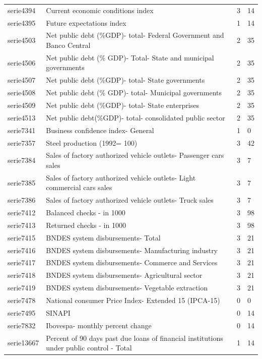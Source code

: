 \documentclass{article}
\begin{document}
{\begin{landscape}
\begin{center}
\begin{longtable}{|l|l|l|l|}
serie4394 & Current economic conditions index & 3 & 14 \\
serie4395 & Future expectations index & 1 & 14 \\
serie4503 & Net public debt (\%GDP)- total- Federal Government and Banco Central & 2 & 35 \\
serie4506 & Net public debt (\% GDP)- Total- State and municipal governments & 2 & 35 \\
serie4507 & Net public debt (\%GDP)- total- State governments & 2 & 35 \\
serie4508 & Net public debt (\% GDP)- total- Municipal governments & 2 & 35 \\
serie4509 & Net public debt (\%GDP)- total- State enterprises & 2 & 35 \\
serie4513 & Net public debt(\%GDP)- total- consolidated public sector & 2 & 35 \\
serie7341 & Business confidence index- General & 1 & 0 \\
serie7357 & Steel production (1992= 100) & 3 & 42 \\
serie7384 & Sales of factory authorized vehicle outlets- Passenger cars sales & 3 & 7 \\
serie7385 & Sales of factory authorized vehicle outlets- Light commercial cars sales & 3 & 7 \\
serie7386 & Sales of factory authorized vehicle outlets- Truck sales & 3 & 7 \\
serie7412 & Balanced checks - in 1000 & 3 & 98 \\
serie7413 & Returned checks - in 1000 & 3 & 98 \\
serie7415 & BNDES system disbursements- Total & 3 & 21 \\
serie7416 & BNDES system disbursements- Manufacturing industry & 3 & 21 \\
serie7417 & BNDES system disbursements- Commerce and Services & 3 & 21 \\
serie7418 & BNDES system disbursements- Agricultural sector & 3 & 21 \\
serie7419 & BNDES system disbursements- Vegetable extraction & 3 & 21 \\
serie7478 & National consumer Price Index- Extended 15 (IPCA-15) & 0 & 0 \\
serie7495 & SINAPI & 0 & 14 \\
serie7832 & Ibovespa- monthly percent change & 0 & 14 \\
serie13667 & Percent of 90 days past due loans of financial institutions under public control - Total & 1 & 14 \\

\end{longtable}
\end{center}
\end{landscape}}
\end{document}
